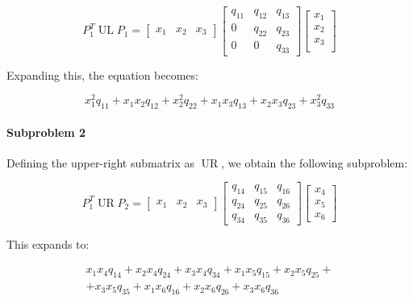 \begin{equation*}
    P_1^T\operatorname{UL}P_1=
    \begin{bmatrix}
        x_1 & x_2 & x_3
    \end{bmatrix}
    \begin{bmatrix}
        q_{11} & q_{12} & q_{13} \\
        0 & q_{22} & q_{23} \\
        0 & 0 & q_{33}
    \end{bmatrix}
    \begin{bmatrix}
        x_1 \\
        x_2 \\
        x_3 \\
    \end{bmatrix}
\end{equation*}

Expanding this, the equation becomes:

\begin{equation}
 x_1^2q_{11} + x_1x_2q_{12} + x_2^2q_{22} + x_1x_3q_{13} + x_2x_3q_{23} + x_3^2q_{33}
    \label{eq:UL}
\end{equation}

\paragraph{Subproblem 2}
Defining the upper-right submatrix as $\operatorname{UR}$, we obtain the following subproblem:

\begin{equation}
    P_1^T\operatorname{UR}P_2=
    \begin{bmatrix}
        x_1 & x_2 & x_3
    \end{bmatrix}
    \begin{bmatrix}
        q_{14} & q_{15} & q_{16} \\
        q_{24} & q_{25} & q_{26} \\
        q_{34} & q_{35} & q_{36}
    \end{bmatrix}
    \begin{bmatrix}
        x_4 \\
        x_5 \\
        x_6
    \end{bmatrix}
    \label{eq:ur}
\end{equation}

This expands to:

\begin{multline}
    x_1x_4q_{14} + x_2x_4q_{24} + x_3x_4q_{34} + x_1x_5q_{15} + x_2x_5q_{25} + \\ 
    + x_3x_5q_{35} + x_1x_6q_{16} + x_2x_6q_{26} + x_3x_6q_{36} 
    \label{eq:UR}
\end{multline}

